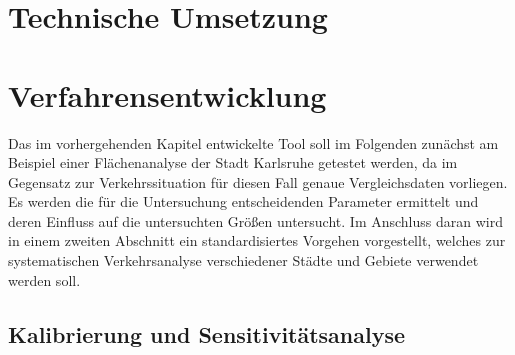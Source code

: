 \documentclass[12pt,a4paper]{scrartcl}
\begin{document}
\newpage  
\section{Technische Umsetzung}


\newpage
\section{Verfahrensentwicklung}

Das im vorhergehenden Kapitel entwickelte Tool soll im Folgenden zunächst am Beispiel einer Flächenanalyse der Stadt Karlsruhe getestet werden, da im Gegensatz zur Verkehrssituation für diesen Fall genaue Vergleichsdaten vorliegen. Es werden die für die Untersuchung entscheidenden Parameter ermittelt und deren Einfluss auf die untersuchten Größen untersucht. Im Anschluss daran wird in einem zweiten Abschnitt ein standardisiertes Vorgehen vorgestellt, welches zur systematischen Verkehrsanalyse verschiedener Städte und Gebiete verwendet werden soll.\\

\subsection{Kalibrierung und Sensitivitätsanalyse}
\end{document}
